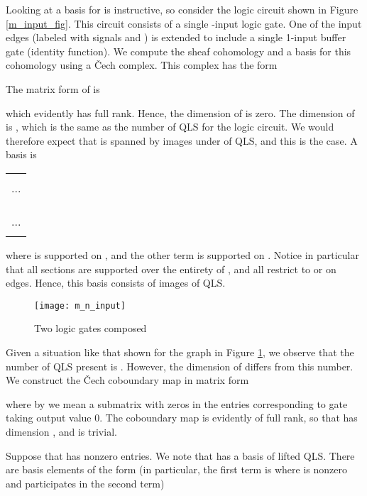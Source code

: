 \documentclass{amsart}
\theoremstyle{plain}
\theoremstyle{definition}
\begin{document}
Looking at a basis for  is instructive, so
consider the logic circuit shown in Figure \ref{m_input_fig}.
This circuit consists of a single -input logic gate.  One of the
input edges (labeled with signals  and ) is extended to
include a single 1-input buffer gate (identity function).  We compute
the sheaf cohomology and a basis for this cohomology using a \v{C}ech
complex.  This complex has the form

The matrix form of  is

which evidently has full rank.  Hence, the dimension of
 is zero.  The dimension of
 is , which is the same as the number of QLS
for the logic circuit.  We would therefore expect that
 is spanned by images under  of QLS, and this
is the case.  A basis is
\begin{center}
\begin{tabular}{c}
\\
\\
...\\
\\
\\
\\
...\\
\\
\end{tabular}
\end{center}
where  is supported on , and the other term is
supported on .  Notice in particular that all sections are
supported over the entirety of , and all restrict to
 or
   on edges.  Hence, this basis
    consists of images of QLS.

\begin{figure}
\begin{center}
\texttt{[image: m\_n\_input]}
\caption{Two logic gates composed}
\label{m_n_input_fig}
\end{center}
\end{figure}

Given a situation like that shown for the graph  in Figure
\ref{m_n_input_fig}, we observe that the number of QLS present is
.  However, the dimension of  differs
from this number.  We construct the \v{C}ech coboundary map  in matrix form

where by  we mean a  submatrix with zeros in the
entries corresponding to gate  taking output value 0.  The
coboundary map is evidently of full rank, so that 
has dimension , and  is trivial.  

Suppose that  has  nonzero entries.  We note that
 has a basis of lifted QLS.  There are  basis
elements of the form (in particular, the first term is where  is
nonzero and  participates in the second term)
\end{document}
